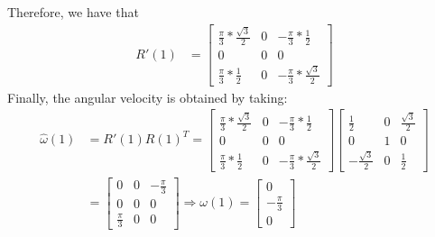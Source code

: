 \documentclass{article}
\begin{document}
\begin{enumerate}
\begin{enumerate}
      Therefore, we have that
      \begin{align*}
       R'(1) &= \begin{bmatrix}
                \frac{\pi}{3}* \frac{\sqrt{3}}{2} & 0 & -\frac{\pi}{3}* \frac{1}{2}
                            \\
                            0 & 0 & 0  \\
                            \frac{\pi}{3} *\frac{1}{2} & 0 & -\frac{\pi}{3} *\frac{\sqrt{3}}{2} 
               \end{bmatrix}
      \end{align*}
      Finally, the angular velocity is obtained by taking:
      \begin{align*}
       \hat \omega(1) & = R'(1) R(1)^T = \begin{bmatrix}
                \frac{\pi}{3}* \frac{\sqrt{3}}{2} & 0 & -\frac{\pi}{3}* \frac{1}{2}
                            \\
                            0 & 0 & 0  \\
                            \frac{\pi}{3} *\frac{1}{2} & 0 & -\frac{\pi}{3} *\frac{\sqrt{3}}{2} \end{bmatrix}
                            \begin{bmatrix}
                            \frac{1}{2}  & 0 & \frac{\sqrt{3}}{2} \\
                            0  &  1 &  0\\
                            -\frac{\sqrt{3}}{2} &  0 & \frac{1}{2} 
                            \end{bmatrix}
                            \\
                &= \begin{bmatrix}
                    0 & 0 & -\frac{\pi}{3} \\
                    0 & 0 & 0\\
                    \frac{\pi}{3} & 0 & 0
                   \end{bmatrix}
    \Rightarrow \omega(1) = \begin{bmatrix}
                             0 \\ -\frac{\pi}{3} \\ 0
                            \end{bmatrix}
      \end{align*}
      

\end{enumerate}
\end{enumerate}
\end{document}

